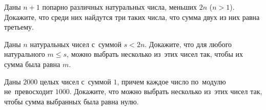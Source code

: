 



\begin{problems}

\item
Даны $n + 1$ попарно различных натуральных числа, меньших $2 n$ ($n > 1$).
Докажите, что среди них найдутся три таких числа, что сумма двух из них равна
третьему.

\item
Даны $n$ натуральных чисел с~суммой $s < 2 n$.
Докажите, что для любого натурального $m \leq s$, можно выбрать несколько
из~этих чисел так, чтобы их сумма была равна $m$.

\item
Даны $2000$ целых чисел с~суммой $1$, причем каждое число по~модулю
не~превосходит $1000$.
Докажите, что можно выбрать несколько из~этих чисел так, чтобы сумма выбранных
была равна нулю.

\end{problems}

